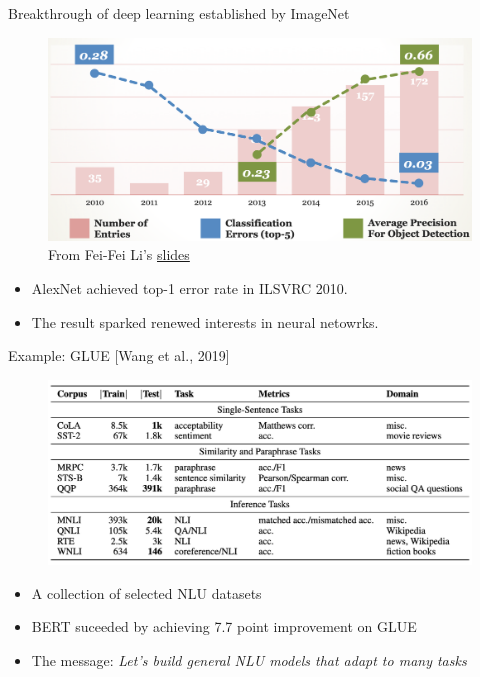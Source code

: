 \documentclass[usenames,dvipsnames,notes,11pt,aspectratio=169,hyperref={colorlinks=true, linkcolor=blue}]{beamer}
\begin{document}
\begin{frame}
    {Breakthrough of deep learning established by ImageNet}
    \begin{figure}
    \includegraphics[height=0.6\textheight]{figures/imagenet-progress}
        \caption{From Fei-Fei Li's \href{https://www.image-net.org/static_files/files/imagenet_ilsvrc2017_v1.0.pdf}{slides}}
    \end{figure}
    \vspace{-1em}
    \begin{itemize}
        \item AlexNet  achieved top-1 error rate in ILSVRC 2010.
        \item The result sparked renewed interests in neural netowrks.
    \end{itemize}
\end{frame}

\begin{frame}
    {Example: GLUE [Wang et al., 2019]}
    \begin{figure}
    \includegraphics[height=0.6\textheight]{figures/glue}
    \end{figure}
    \vspace{-1em}
    \begin{itemize}
        \item A collection of selected NLU datasets 
        \item BERT suceeded by achieving 7.7 point improvement on GLUE
        \item The message: \textit{Let's build general NLU models that adapt to many tasks}
    \end{itemize}
\end{frame}
\end{document}

